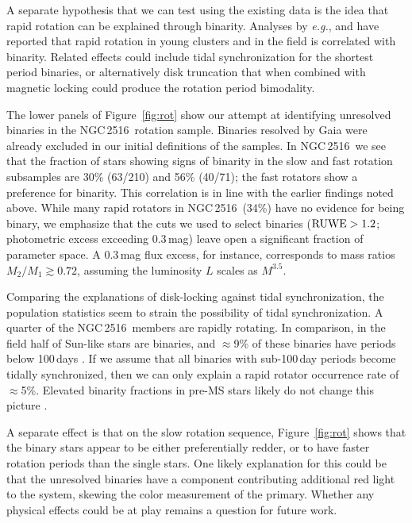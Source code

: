 \documentclass[12pt,twocolumn,tighten]{aastex63}
\newcommand{\cn}{NGC\,2516} %
\begin{document}
A separate hypothesis that we can test using the existing data is the
idea that rapid rotation can be explained through binarity.  Analyses
by {\it e.g.}, \citet{gillen_ngts_2020} and
\citet{simonian_rapid_2019} have reported that rapid rotation in young
clusters and in the field is correlated with binarity.  Related
effects could include tidal synchronization for the shortest period
binaries, or alternatively disk truncation that when combined with
magnetic locking \citep[{\it
e.g.},][]{koenigl_disk_1991,long_locking_2005} could produce the
rotation period bimodality.

The lower panels of Figure~\ref{fig:rot} show our attempt at
identifying unresolved binaries in the \cn\ rotation sample.  Binaries
resolved by Gaia were already excluded in our initial definitions of
the samples.  In \cn\, we see that the fraction of stars showing signs
of binarity in the slow and fast rotation subsamples are 30\% (63/210)
and 56\% (40/71); the fast rotators show a preference for binarity.
This correlation is in line with the earlier findings noted above.
While many rapid rotators in \cn\ (34\%) have no evidence for being
binary, we emphasize that the cuts we used to select binaries (${\rm
RUWE}>1.2$; photometric excess exceeding 0.3\,mag) leave open a
significant fraction of parameter space.  A 0.3\,mag flux excess, for
instance, corresponds to mass ratios $M_2/M_1 \gtrsim 0.72$, assuming
the luminosity $L$ scales as $M^{3.5}$. 

Comparing the explanations of disk-locking against tidal
synchronization, the population statistics seem to strain the
possibility of tidal synchronization.  A quarter of the \cn\ members
are rapidly rotating.  In comparison, in the field half of Sun-like
stars are binaries, and $\approx$9\% of these binaries have periods below 100\,days
\citep{raghavan_survey_2010}.  If we assume that all binaries with
sub-100\,day periods become tidally synchronized, then we can only explain
a rapid rotator occurrence rate of $\approx$5\%.  Elevated binarity
fractions in pre-MS stars likely do not change this picture \citep[see
Sec.~4.4 of][]{duchene_stellar_2013}.

A separate effect is that on the slow rotation sequence,
Figure~\ref{fig:rot} shows that the binary stars appear to be either
preferentially redder, or to have faster rotation periods than the
single stars.  One likely explanation for this could be that the
unresolved binaries have a component contributing additional red light
to the system, skewing the color measurement of the primary.  Whether
any physical effects could be at play remains a question for future
work.
\end{document}
